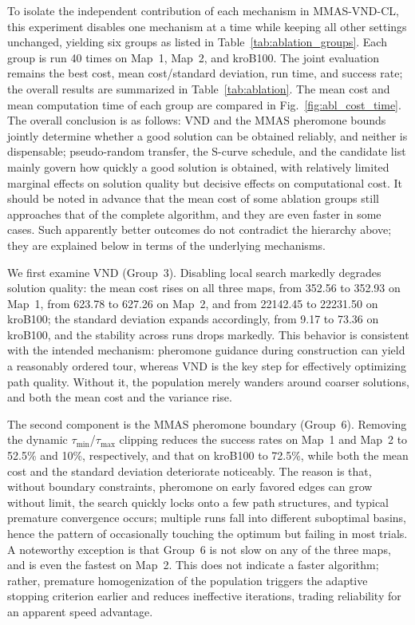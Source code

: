 \documentclass[pdflatex,sn-basic,Numbered]{sn-jnl}
\begin{document}
To isolate the independent contribution of each mechanism in MMAS-VND-CL, this experiment disables one mechanism at a time while keeping all other settings unchanged, yielding six groups as listed in Table~\ref{tab:ablation_groups}. Each group is run 40 times on Map~1, Map~2, and kroB100. The joint evaluation remains the best cost, mean cost/standard deviation, run time, and success rate; the overall results are summarized in Table~\ref{tab:ablation}. The mean cost and mean computation time of each group are compared in Fig.~\ref{fig:abl_cost_time}. The overall conclusion is as follows: VND and the MMAS pheromone bounds jointly determine whether a good solution can be obtained reliably, and neither is dispensable; pseudo-random transfer, the S-curve schedule, and the candidate list mainly govern how quickly a good solution is obtained, with relatively limited marginal effects on solution quality but decisive effects on computational cost. It should be noted in advance that the mean cost of some ablation groups still approaches that of the complete algorithm, and they are even faster in some cases. Such apparently better outcomes do not contradict the hierarchy above; they are explained below in terms of the underlying mechanisms.

We first examine VND (Group~3). Disabling local search markedly degrades solution quality: the mean cost rises on all three maps, from 352.56 to 352.93 on Map~1, from 623.78 to 627.26 on Map~2, and from 22142.45 to 22231.50 on kroB100; the standard deviation expands accordingly, from 9.17 to 73.36 on kroB100, and the stability across runs drops markedly. This behavior is consistent with the intended mechanism: pheromone guidance during construction can yield a reasonably ordered tour, whereas VND is the key step for effectively optimizing path quality. Without it, the population merely wanders around coarser solutions, and both the mean cost and the variance rise.

The second component is the MMAS pheromone boundary (Group~6). Removing the dynamic $\tau_{\min}$/$\tau_{\max}$ clipping reduces the success rates on Map~1 and Map~2 to 52.5\% and 10\%, respectively, and that on kroB100 to 72.5\%, while both the mean cost and the standard deviation deteriorate noticeably. The reason is that, without boundary constraints, pheromone on early favored edges can grow without limit, the search quickly locks onto a few path structures, and typical premature convergence occurs; multiple runs fall into different suboptimal basins, hence the pattern of occasionally touching the optimum but failing in most trials. A noteworthy exception is that Group~6 is not slow on any of the three maps, and is even the fastest on Map~2. This does not indicate a faster algorithm; rather, premature homogenization of the population triggers the adaptive stopping criterion earlier and reduces ineffective iterations, trading reliability for an apparent speed advantage.
\end{document}
